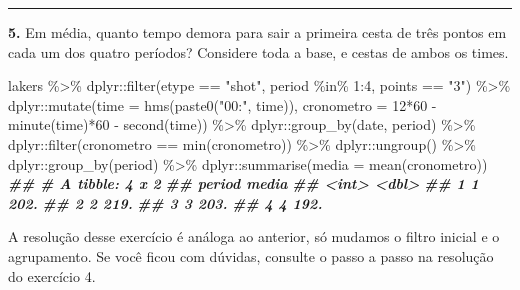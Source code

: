 \documentclass[
]{book}
\newenvironment{Shaded}{\begin{snugshade}}{\end{snugshade}}
\newcommand{\AttributeTok}[1]{\textcolor[rgb]{0.77,0.63,0.00}{#1}}
\newcommand{\DecValTok}[1]{\textcolor[rgb]{0.00,0.00,0.81}{#1}}
\newcommand{\DocumentationTok}[1]{\textcolor[rgb]{0.56,0.35,0.01}{\textbf{\textit{#1}}}}
\newcommand{\FunctionTok}[1]{\textcolor[rgb]{0.00,0.00,0.00}{#1}}
\newcommand{\NormalTok}[1]{#1}
\newcommand{\SpecialCharTok}[1]{\textcolor[rgb]{0.00,0.00,0.00}{#1}}
\newcommand{\StringTok}[1]{\textcolor[rgb]{0.31,0.60,0.02}{#1}}
\begin{document}
\begin{center}\rule{0.5\linewidth}{0.5pt}\end{center}

\textbf{5.} Em média, quanto tempo demora para sair a primeira cesta de três pontos em cada um dos quatro períodos? Considere toda a base, e cestas de ambos os times.

\begin{Shaded}
\begin{Highlighting}[]
\NormalTok{lakers }\SpecialCharTok{\%\textgreater{}\%} 
\NormalTok{  dplyr}\SpecialCharTok{::}\FunctionTok{filter}\NormalTok{(etype }\SpecialCharTok{==} \StringTok{"shot"}\NormalTok{, period }\SpecialCharTok{\%in\%} \DecValTok{1}\SpecialCharTok{:}\DecValTok{4}\NormalTok{, points }\SpecialCharTok{==} \StringTok{"3"}\NormalTok{) }\SpecialCharTok{\%\textgreater{}\%} 
\NormalTok{  dplyr}\SpecialCharTok{::}\FunctionTok{mutate}\NormalTok{(}\AttributeTok{time =} \FunctionTok{hms}\NormalTok{(}\FunctionTok{paste0}\NormalTok{(}\StringTok{"00:"}\NormalTok{, time)),}
                \AttributeTok{cronometro =} \DecValTok{12}\SpecialCharTok{*}\DecValTok{60} \SpecialCharTok{{-}} \FunctionTok{minute}\NormalTok{(time)}\SpecialCharTok{*}\DecValTok{60} \SpecialCharTok{{-}} \FunctionTok{second}\NormalTok{(time)) }\SpecialCharTok{\%\textgreater{}\%} 
\NormalTok{  dplyr}\SpecialCharTok{::}\FunctionTok{group\_by}\NormalTok{(date, period) }\SpecialCharTok{\%\textgreater{}\%} 
\NormalTok{  dplyr}\SpecialCharTok{::}\FunctionTok{filter}\NormalTok{(cronometro }\SpecialCharTok{==} \FunctionTok{min}\NormalTok{(cronometro)) }\SpecialCharTok{\%\textgreater{}\%} 
\NormalTok{  dplyr}\SpecialCharTok{::}\FunctionTok{ungroup}\NormalTok{() }\SpecialCharTok{\%\textgreater{}\%}
\NormalTok{  dplyr}\SpecialCharTok{::}\FunctionTok{group\_by}\NormalTok{(period) }\SpecialCharTok{\%\textgreater{}\%} 
\NormalTok{  dplyr}\SpecialCharTok{::}\FunctionTok{summarise}\NormalTok{(}\AttributeTok{media =} \FunctionTok{mean}\NormalTok{(cronometro))}
\DocumentationTok{\#\# \# A tibble: 4 x 2}
\DocumentationTok{\#\#   period media}
\DocumentationTok{\#\#    \textless{}int\textgreater{} \textless{}dbl\textgreater{}}
\DocumentationTok{\#\# 1      1  202.}
\DocumentationTok{\#\# 2      2  219.}
\DocumentationTok{\#\# 3      3  203.}
\DocumentationTok{\#\# 4      4  192.}
\end{Highlighting}
\end{Shaded}

A resolução desse exercício é análoga ao anterior, só mudamos o filtro inicial e o agrupamento. Se você ficou com dúvidas, consulte o passo a passo na resolução do exercício 4.
\end{document}
